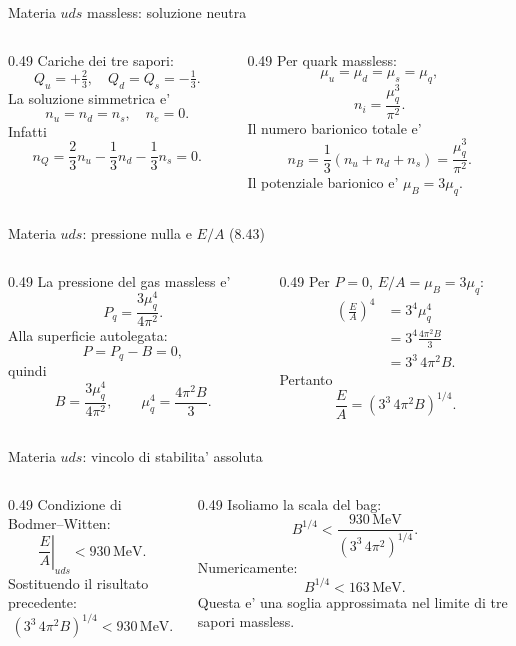 \begin{frame}{Materia $uds$ massless: soluzione neutra}
\small
\begin{columns}[T,onlytextwidth]
\begin{column}{0.49\textwidth}
Cariche dei tre sapori:
\[
Q_u=+\tfrac23,\quad
Q_d=Q_s=-\tfrac13.
\]
La soluzione simmetrica e'
\[
n_u=n_d=n_s,\quad n_e=0.
\]
Infatti
\[
n_Q=\frac23n_u-\frac13n_d-\frac13n_s=0.
\]
\end{column}
\begin{column}{0.49\textwidth}
Per quark massless:
\[
\mu_u=\mu_d=\mu_s=\mu_q,
\]
\[
n_i=\frac{\mu_q^3}{\pi^2}.
\]
Il numero barionico totale e'
\[
n_B=\frac13(n_u+n_d+n_s)
=\frac{\mu_q^3}{\pi^2}.
\]
Il potenziale barionico e' $\mu_B=3\mu_q$.
\end{column}
\end{columns}
\end{frame}

\begin{frame}{Materia $uds$: pressione nulla e $E/A$ (8.43)}
\small
\begin{columns}[T,onlytextwidth]
\begin{column}{0.49\textwidth}
La pressione del gas massless e'
\[
P_q=\frac{3\mu_q^4}{4\pi^2}.
\]
Alla superficie autolegata:
\[
P=P_q-B=0,
\]
quindi
\[
B=\frac{3\mu_q^4}{4\pi^2},
\qquad \mu_q^4=\frac{4\pi^2B}{3}.
\]
\end{column}
\begin{column}{0.49\textwidth}
Per $P=0$, $E/A=\mu_B=3\mu_q$:
\begin{align*}
\left(\frac EA\right)^4
&=3^4\mu_q^4\\
&=3^4\frac{4\pi^2B}{3}\\
&=3^3\,4\pi^2B.
\end{align*}
Pertanto
\[
\frac EA=(3^3\,4\pi^2B)^{1/4}.
\]
\end{column}
\end{columns}
\end{frame}

\begin{frame}{Materia $uds$: vincolo di stabilita' assoluta}
\small
\begin{columns}[T,onlytextwidth]
\begin{column}{0.49\textwidth}
Condizione di Bodmer--Witten:
\[
\left.\frac EA\right|_{uds}<930\,\mathrm{MeV}.
\]
Sostituendo il risultato precedente:
\[
(3^3\,4\pi^2B)^{1/4}
<930\,\mathrm{MeV}.
\]
\end{column}
\begin{column}{0.49\textwidth}
Isoliamo la scala del bag:
\[
B^{1/4}<\frac{930\,\mathrm{MeV}}
{(3^3\,4\pi^2)^{1/4}}.
\]
Numericamente:
\[
B^{1/4}<163\,\mathrm{MeV}.
\]
Questa e' una soglia approssimata
nel limite di tre sapori massless.
\end{column}
\end{columns}
\end{frame}

